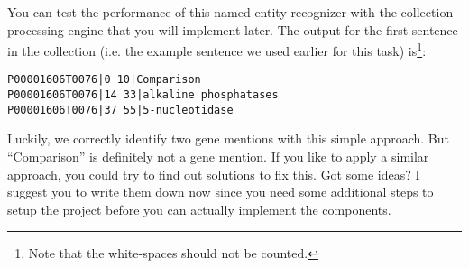 \small

\normalsize

You can test the performance of this named entity recognizer with the collection
processing engine that you will implement later. The output for the first
sentence in the collection (i.e. the example sentence we used earlier for this
task) is\footnote{Note that the white-spaces should not be counted.}:

\begin{verbatim}
P00001606T0076|0 10|Comparison
P00001606T0076|14 33|alkaline phosphatases
P00001606T0076|37 55|5-nucleotidase
\end{verbatim}

Luckily, we correctly identify two gene mentions with this simple approach. But
``Comparison'' is definitely not a gene mention. If you like to apply a similar
approach, you could try to find out solutions to fix this. Got some ideas? I
suggest you to write them down now since you need some additional steps to setup
the project before you can actually implement the components.
